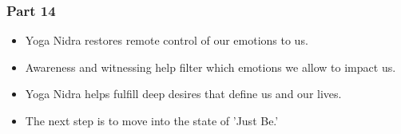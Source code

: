 \begin{frame}[fragile]\frametitle{Part 14}

\begin{itemize}
    \item Yoga Nidra restores remote control of our emotions to us.
    \item Awareness and witnessing help filter which emotions we allow to impact us.
    \item Yoga Nidra helps fulfill deep desires that define us and our lives.
    \item The next step is to move into the state of 'Just Be.'
\end{itemize}

\end{frame}



